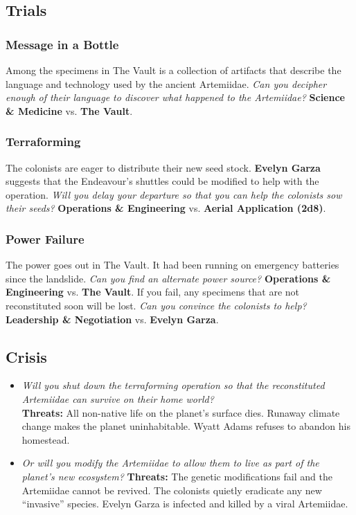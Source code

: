 \documentclass[11pt, a5paper, parskip=half-, DIV=12]{scrartcl}
\begin{document}
\subsection*{Trials}

\subsubsection*{Message in a Bottle}
Among the specimens in The Vault is a collection of artifacts that describe the language and technology used by the ancient Artemiidae. \textit{Can you decipher enough of their language to discover what happened to the Artemiidae?} \textbf{Science \& Medicine} vs. \textbf{The Vault}.%

\subsubsection*{Terraforming}
The colonists are eager to distribute their new seed stock. \textbf{Evelyn Garza} suggests that the Endeavour's shuttles could be modified to help with the operation. \textit{Will you delay your departure so that you can help the colonists sow their seeds?}
\textbf{Operations \& Engineering} vs. \textbf{Aerial Application (2d8)}.

\subsubsection*{Power Failure}
The power goes out in The Vault. It had been running on emergency batteries since the landslide. \textit{Can you find an alternate power source?} \textbf{Operations \& Engineering} vs. \textbf{The Vault}. If you fail, any specimens that are not reconstituted soon will be lost. \textit{Can you convince the colonists to help?} \textbf{Leadership \& Negotiation} vs. \textbf{Evelyn Garza}.



\subsection*{Crisis}
\begin{itemize}
	\item \textit{Will you shut down the terraforming operation so that the reconstituted Artemiidae can survive on their home world?} \\ \textbf{Threats:} All non-native life on the planet's surface dies. Runaway climate change makes the planet uninhabitable. Wyatt Adams refuses to abandon his homestead.
	\item \textit{Or will you modify the Artemiidae to allow them to live as part of the planet's new ecosystem?} \textbf{Threats:} The genetic modifications fail and the Artemiidae cannot be revived. The colonists quietly eradicate any new ``invasive'' species. Evelyn Garza is infected and killed by a viral Artemiidae.
\end{itemize}
\end{document}
